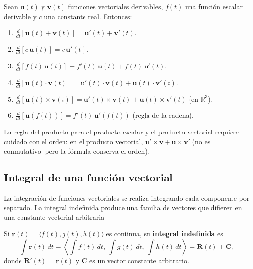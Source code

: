 \begin{theorem}
Sean $\mathbf{u}(t)$ y $\mathbf{v}(t)$ funciones vectoriales derivables,
$f(t)$ una función escalar derivable y $c$ una constante real. Entonces:
\begin{enumerate}
  \item $\displaystyle \frac{d}{dt}[\mathbf{u}(t) + \mathbf{v}(t)]
        = \mathbf{u}'(t) + \mathbf{v}'(t)$.
  \item $\displaystyle \frac{d}{dt}[c\,\mathbf{u}(t)]
        = c\,\mathbf{u}'(t)$.
  \item $\displaystyle \frac{d}{dt}[f(t)\,\mathbf{u}(t)]
        = f'(t)\,\mathbf{u}(t) + f(t)\,\mathbf{u}'(t)$.
  \item $\displaystyle \frac{d}{dt}[\mathbf{u}(t)\cdot \mathbf{v}(t)]
        = \mathbf{u}'(t)\cdot \mathbf{v}(t) + \mathbf{u}(t)\cdot \mathbf{v}'(t)$.
  \item $\displaystyle \frac{d}{dt}[\mathbf{u}(t)\times \mathbf{v}(t)]
        = \mathbf{u}'(t)\times \mathbf{v}(t) + \mathbf{u}(t)\times \mathbf{v}'(t)$
        (en $\mathbb{R}^3$).
  \item $\displaystyle \frac{d}{dt}[\mathbf{u}(f(t))]
        = f'(t)\,\mathbf{u}'(f(t))$ \quad (regla de la cadena).
\end{enumerate}
\end{theorem}

\begin{rem}
La regla del producto para el producto escalar y el producto vectorial
requiere cuidado con el orden: en el producto vectorial, $\mathbf{u}'
\times \mathbf{v} + \mathbf{u} \times \mathbf{v}'$ (no es conmutativo,
pero la fórmula conserva el orden).
\end{rem}

\subsection{Integral de una función vectorial}

La integración de funciones vectoriales se realiza integrando cada
componente por separado. La integral indefinida produce una familia de
vectores que difieren en una constante vectorial arbitraria.

\begin{definition}
Si $\mathbf{r}(t) = \langle f(t), g(t), h(t) \rangle$ es continua,
su \textbf{integral indefinida} es
\[
\int \mathbf{r}(t)\,dt
= \left\langle \int f(t)\,dt,\; \int g(t)\,dt,\; \int h(t)\,dt \right\rangle
= \mathbf{R}(t) + \mathbf{C},
\]
donde $\mathbf{R}'(t) = \mathbf{r}(t)$ y $\mathbf{C}$ es un vector
constante arbitrario.
\end{definition}

